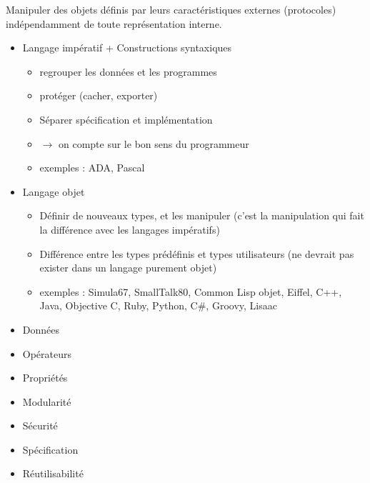  Manipuler des objets définis par leurs caractéristiques externes (protocoles) indépendamment de toute représentation interne. \\

\begin{itemize}
	\item Langage impératif + Constructions syntaxiques 
		\begin{itemize}
			\item regrouper les données et les programmes
			\item protéger (cacher, exporter)
			\item Séparer spécification et implémentation
			\item $\rightarrow$ on compte sur le bon sens du programmeur
			\item exemples : ADA, Pascal
		\end{itemize}
	\item Langage objet
		\begin{itemize}
			\item Définir de nouveaux types, et les manipuler (c'est la manipulation qui fait la différence avec les langages impératifs)
			\item Différence entre les types prédéfinis et types utilisateurs (ne devrait pas exister dans un langage purement objet)
			\item exemples : Simula67, SmallTalk80, Common Lisp objet, Eiffel, C++, Java, Objective C, Ruby, Python, C\#, Groovy, Lisaac
		\end{itemize}
\end{itemize}

\begin{itemize}
	\item Données
	\item Opérateurs
	\item Propriétés
\end{itemize}

\begin{itemize}
	\item Modularité
	\item Sécurité
	\item Spécification
	\item Réutilisabilité
\end{itemize}

